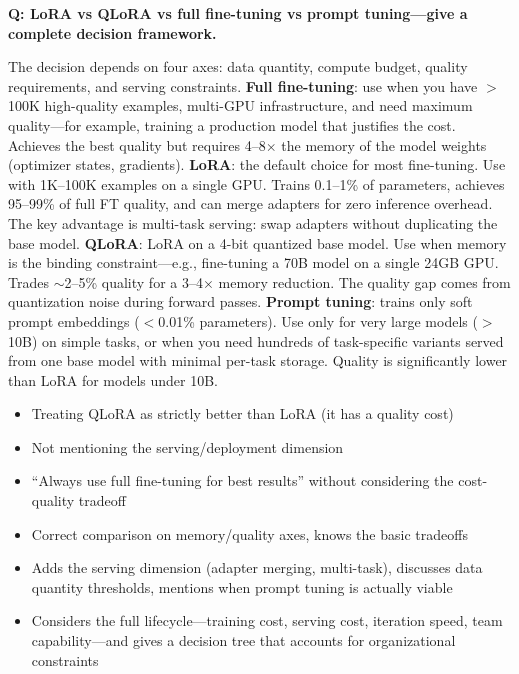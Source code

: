 \begin{interviewq}
\textbf{Q: LoRA vs QLoRA vs full fine-tuning vs prompt tuning---give a complete decision framework.}

 \quad {} \quad \badgefreq{\freqhigh}

\stronganswer The decision depends on four axes: data quantity, compute budget, quality requirements, and serving constraints. \textbf{Full fine-tuning}: use when you have $>$100K high-quality examples, multi-GPU infrastructure, and need maximum quality---for example, training a production model that justifies the cost. Achieves the best quality but requires 4--8$\times$ the memory of the model weights (optimizer states, gradients). \textbf{LoRA}: the default choice for most fine-tuning. Use with 1K--100K examples on a single GPU. Trains 0.1--1\% of parameters, achieves 95--99\% of full FT quality, and can merge adapters for zero inference overhead. The key advantage is multi-task serving: swap adapters without duplicating the base model. \textbf{QLoRA}: LoRA on a 4-bit quantized base model. Use when memory is the binding constraint---e.g., fine-tuning a 70B model on a single 24GB GPU. Trades $\sim$2--5\% quality for a 3--4$\times$ memory reduction. The quality gap comes from quantization noise during forward passes. \textbf{Prompt tuning}: trains only soft prompt embeddings ($<$0.01\% parameters). Use only for very large models ($>$10B) on simple tasks, or when you need hundreds of task-specific variants served from one base model with minimal per-task storage. Quality is significantly lower than LoRA for models under 10B.

\redflags
\begin{itemize}
    \item Treating QLoRA as strictly better than LoRA (it has a quality cost)
    \item Not mentioning the serving/deployment dimension
    \item ``Always use full fine-tuning for best results'' without considering the cost-quality tradeoff
\end{itemize}


\goodgreat
\begin{itemize}
    \item {} Correct comparison on memory/quality axes, knows the basic tradeoffs
    \item {} Adds the serving dimension (adapter merging, multi-task), discusses data quantity thresholds, mentions when prompt tuning is actually viable
    \item {} Considers the full lifecycle---training cost, serving cost, iteration speed, team capability---and gives a decision tree that accounts for organizational constraints
\end{itemize}

\end{interviewq}

